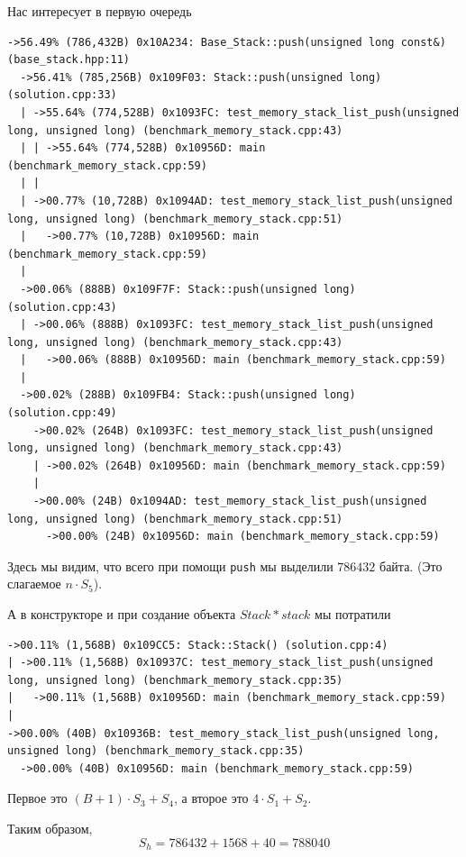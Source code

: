 Нас интересует в первую очередь
\begin{lstlisting}[caption={}, label={}, style=style_code_block]
->56.49% (786,432B) 0x10A234: Base_Stack::push(unsigned long const&) (base_stack.hpp:11)
  ->56.41% (785,256B) 0x109F03: Stack::push(unsigned long) (solution.cpp:33)
  | ->55.64% (774,528B) 0x1093FC: test_memory_stack_list_push(unsigned long, unsigned long) (benchmark_memory_stack.cpp:43)
  | | ->55.64% (774,528B) 0x10956D: main (benchmark_memory_stack.cpp:59)
  | |   
  | ->00.77% (10,728B) 0x1094AD: test_memory_stack_list_push(unsigned long, unsigned long) (benchmark_memory_stack.cpp:51)
  |   ->00.77% (10,728B) 0x10956D: main (benchmark_memory_stack.cpp:59)
  |     
  ->00.06% (888B) 0x109F7F: Stack::push(unsigned long) (solution.cpp:43)
  | ->00.06% (888B) 0x1093FC: test_memory_stack_list_push(unsigned long, unsigned long) (benchmark_memory_stack.cpp:43)
  |   ->00.06% (888B) 0x10956D: main (benchmark_memory_stack.cpp:59)
  |     
  ->00.02% (288B) 0x109FB4: Stack::push(unsigned long) (solution.cpp:49)
    ->00.02% (264B) 0x1093FC: test_memory_stack_list_push(unsigned long, unsigned long) (benchmark_memory_stack.cpp:43)
    | ->00.02% (264B) 0x10956D: main (benchmark_memory_stack.cpp:59)
    |   
    ->00.00% (24B) 0x1094AD: test_memory_stack_list_push(unsigned long, unsigned long) (benchmark_memory_stack.cpp:51)
      ->00.00% (24B) 0x10956D: main (benchmark_memory_stack.cpp:59)
\end{lstlisting}
Здесь мы видим, что всего при помощи \texttt{push} мы выделили \(786432\) байта. (Это слагаемое \(n\cdot S_5\)).

А в конструкторе и при создание объекта \(Stack* stack\) мы потратили
\begin{lstlisting}[caption={}, label={}, style=style_code_block]
->00.11% (1,568B) 0x109CC5: Stack::Stack() (solution.cpp:4)
| ->00.11% (1,568B) 0x10937C: test_memory_stack_list_push(unsigned long, unsigned long) (benchmark_memory_stack.cpp:35)
|   ->00.11% (1,568B) 0x10956D: main (benchmark_memory_stack.cpp:59)
|     
->00.00% (40B) 0x10936B: test_memory_stack_list_push(unsigned long, unsigned long) (benchmark_memory_stack.cpp:35)
  ->00.00% (40B) 0x10956D: main (benchmark_memory_stack.cpp:59)
\end{lstlisting}
Первое это \((B + 1)\cdot S_3 + S_4\), а второе это \(4\cdot S_1 + S_2\).

Таким образом, 
\begin{dmath*}
  S_h = 786432 + 1568 + 40 = 788040
\end{dmath*}

